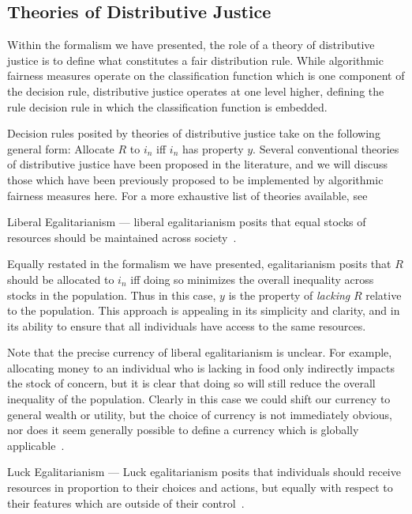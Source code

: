 \subsection{Theories of Distributive Justice}

Within the formalism we have presented, the role of a theory of distributive
justice is to define what constitutes a fair distribution rule. While 
algorithmic fairness measures operate on the classification function which is
one component of the decision rule, distributive justice operates at one level
higher, defining the rule decision rule in which the classification function is
embedded.

Decision rules posited by theories of distributive justice take on the following
general form: Allocate $R$ to $i_n$ iff $i_n$ has property $y$. Several
conventional theories of distributive justice have been proposed in the
literature, and we will discuss those which have been previously proposed to be
implemented by algorithmic fairness measures here. For a more exhaustive list of
theories available, see~\cite{Kuppler_2021}

\begin{definition}
    Liberal Egalitarianism — liberal egalitarianism posits that equal stocks of
    resources should be maintained across society~\cite{Rawls_1971}.
\end{definition}

Equally restated in the formalism we have presented, egalitarianism posits that
$R$ should be allocated to $i_n$ iff doing so minimizes the overall inequality
across stocks in the population. Thus in this case, $y$ is the property of
\textit{lacking} $R$ relative to the population. This approach is appealing in
its simplicity and clarity, and in its ability to ensure that all individuals
have access to the same resources.

Note that the precise currency of liberal egalitarianism is unclear. For
example, allocating money to an individual who is lacking in food only
indirectly impacts the stock of concern, but it is clear that doing so will
still reduce the overall inequality of the population. Clearly in this case we
could shift our currency to general wealth or utility, but the choice of
currency is not immediately obvious, nor does it seem generally possible to
define a currency which is globally applicable~\cite{Binns_2018}.

\begin{definition}
    Luck Egalitarianism — Luck egalitarianism posits that individuals should
    receive resources in proportion to their choices and actions, but equally
    with respect to their features which are outside of their
    control~\cite{Knight_2013}.
\end{definition}

